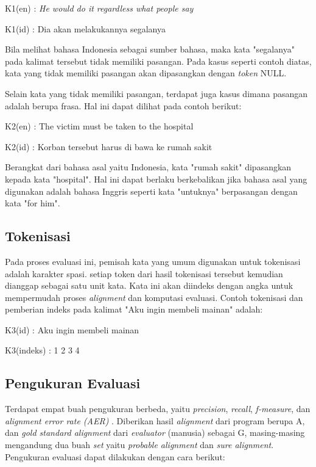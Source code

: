 K1(en) : \textit{He would do it regardless what people say}

K1(id) : Dia akan melakukannya segalanya


Bila melihat bahasa Indonesia sebagai sumber bahasa, maka kata "segalanya" pada kalimat tersebut tidak memiliki pasangan. Pada kasus seperti contoh diatas, kata yang tidak memiliki pasangan akan dipasangkan dengan \textit{token} NULL.


Selain kata yang tidak memiliki pasangan, terdapat juga kasus dimana pasangan adalah berupa frasa. Hal ini dapat dilihat pada contoh berikut:


K2(en) : The victim must be taken to the hospital

K2(id) : Korban tersebut harus di bawa ke rumah sakit


Berangkat dari bahasa asal yaitu Indonesia, kata "rumah sakit" dipasangkan kepada kata "hospital". Hal ini dapat berlaku berkebalikan jika bahasa asal yang digunakan adalah bahasa Inggris seperti kata "untuknya" berpasangan dengan kata "for him".

\subsection{Tokenisasi}

Pada proses evaluasi ini, pemisah kata yang umum digunakan untuk tokenisasi adalah karakter spasi. setiap token dari hasil tokenisasi tersebut kemudian dianggap sebagai satu unit kata. Kata ini akan diindeks dengan angka untuk mempermudah proses \textit{alignment} dan komputasi evaluasi. Contoh tokenisasi dan pemberian indeks pada kalimat "Aku ingin membeli mainan" adalah:

K3(id) : Aku ingin membeli mainan

K3(indeks) : 1 2 3 4

\subsection{Pengukuran Evaluasi}
Terdapat empat buah pengukuran berbeda, yaitu \textit{precision}, \textit{recall}, \textit{f-measure}, dan \textit{alignment error rate (AER)} \citep{mihalcea2003evaluation}. Diberikan hasil \textit{alignment} dari program berupa A, dan \textit{gold standard alignment} dari \textit{evaluator} (manusia) sebagai G, masing-masing mengandung dua buah \textit{set} yaitu \textit{probable alignment} dan \textit{sure alignment}. Pengukuran evaluasi dapat dilakukan dengan cara berikut:

